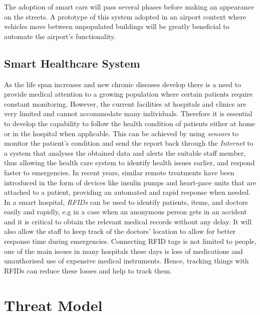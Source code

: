 \documentclass{llncs}
\begin{document}
The adoption of smart cars will pass several phases before making an appearance on the streets. A prototype of this system adopted in an airport context where vehicles move between unpopulated buildings will be greatly beneficial to automate the airport's functionality. 
 
\subsection{Smart Healthcare System}
As the life span increases and new chronic diseases develop there is a need to provide medical attention to a growing population where certain patients require constant monitoring. However, the current facilities at hospitals and clinics are very limited and cannot accommodate many individuals. Therefore it is essential to develop the capability to follow the health condition of patients either at home or in the hospital when applicable. This can be achieved by using \textit{sensors} to monitor the patient's condition and send the report back through the \textit{Internet} to a system that analyses the obtained data and alerts the suitable staff member, thus allowing the health care system to identify health issues earlier, and respond faster to emergencies. In recent years, similar remote treatments have been introduced in the form of devices like insulin pumps and heart-pace units that are attached to a patient, providing an automated and rapid response when needed.\\
In a smart hospital, \textit{RFIDs} can be used to identify patients, items, and doctors easily and rapidly, e.g in a case when an anonymous person gets in an accident and it is critical to obtain the relevant medical records without any delay. It will also allow the staff to keep track of the doctors' location to allow for better response time during emergencies. Connecting RFID tags is not limited to people, one of the main issues in many hospitals these days is loss of medications and unauthorised use of expensive medical instruments\cite{Moto2011}. Hence, tracking things with RFIDs can reduce these losses and help to track them. 

\section{Threat Model}
\end{document}
